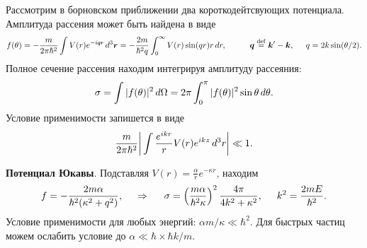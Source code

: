
Рассмотрим в борновском приближении два короткодейтсвующих потенциала. Амплитуда рассения может быть найдена в виде
\begin{equation*}
	f(\theta) = - \frac{m}{2 \pi \hbar^2} \int V(r) e^{-i \smallvc{q} \smallvc{r}} \d^3 \vc{r} = - \frac{2m}{\hbar^2 q} \int_{0}^{\infty} V(r) \sin(qr) r \d r,
	\hspace{10 mm} 
	\vc{q} \overset{\mathrm{def}}{=} \vc{k}' - \vc{k},
	\hspace{5 mm} 
	q = 2 k \sin(\theta/2).
\end{equation*}
Полное сечение рассения находим интегрируя амплитуду рассеяния:
\begin{equation*}
	\sigma = \int |f(\theta)|^2 \, d \Omega = 2 \pi \int_{0}^{\pi} |f(\theta)|^2 \sin \theta \, d \theta.
\end{equation*}
Условие применимости запишется в виде
\begin{equation*}
	\frac{m}{2\pi \hbar^2} \bigg| \int \frac{e^{i k r}}{r} V(r) e^{i k z} \, d^3 r \bigg| \ll 1.
\end{equation*}


\textbf{Потенциал Юкавы}. Подставляя $V(r) = \frac{\alpha}{r} e^{- \kappa r}$, находим
\begin{equation*}
	f = - \frac{2 m \alpha}{\hbar^2 (\kappa^2 + q^2)},
	\hspace{0.5cm} \Rightarrow \hspace{0.5cm}
	\sigma = \left(\frac{m \alpha}{\hbar^2 \kappa}\right)^2 \frac{4\pi}{4 k^2 + \kappa^2},
	\hspace{5 mm} 
	k^2 = \frac{2 mE}{\hbar^2}.
\end{equation*}
Условие применимости для любых энергий: $\alpha m / \kappa \ll \hbar^2$. Для быстрых частиц можем ослабить условие до $\alpha \ll \hbar \times \hbar k/m$.


